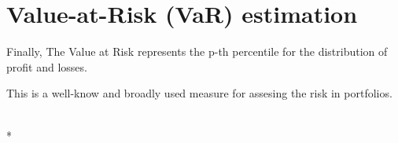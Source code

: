 \documentclass[letterpaper,10pt,english]{/anaconda/lib/python2.7/site-packages/sphinx/texinputs/sphinxhowto}
\def\smaller{\fontsize{9.5pt}{9.5pt}\selectfont}
\begin{document}
        
    
\part{Value-at-Risk (VaR) estimation}Finally, The Value at Risk represents the p-th percentile for the
distribution of profit and losses.

This is a well-know and broadly used measure for assesing the risk in
portfolios.


    
        \vspace{6pt}
        \makebox[0.1\linewidth]{\smaller\hfill\tt\color{nbframe-in-prompt}In\hspace{4pt}{[}32{]}:\hspace{4pt}}\\*
        \vspace{-2.65\baselineskip}
\end{document}
